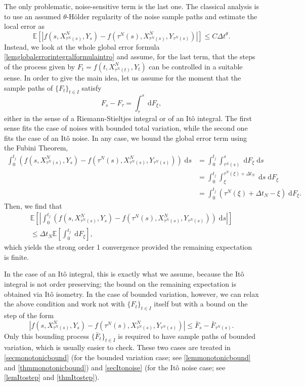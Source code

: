 \documentclass[reqno,12pt]{amsart}
\theoremstyle{plain}%
\theoremstyle{definition}
\begin{document}
The only problematic, noise-sensitive term is the last one. The classical analysis is to use an assumed $\theta$-H\"older regularity of the noise sample paths and estimate the local error as
\[
    \mathbb{E}\left[\left|f(s, X_{\tau^N(s)}^N, Y_s) - f(\tau^N(s), X_{\tau^N(s)}^N, Y_{\tau^N(s)})\right|\right] \leq C\Delta t^{\theta}.
\]
Instead, we look at the whole global error formula \eqref{lemglobalerrorintegralformulaintro} and assume, for the last term, that the steps of the process given by $F_t = f(t, X_{\tau^N(t)}^N, Y_t)$ can be controlled in a suitable sense. In order to give the main idea, let us assume for the moment that the sample paths of $\{F_t\}_{t\in I}$ satisfy
\[
    F_s - F_\tau = \int_\tau^s \;\mathrm{d}F_\xi,
\]
either in the sense of a Riemann-Stieltjes integral or of an It\^o integral. The first sense fits the case of noises with bounded total variation, while the second one fits the case of an It\^o noise. In any case, we bound the global error term using the Fubini Theorem,
\begin{align*}
    \int_0^{t_j} \left( f(s, X_{\tau^N(s)}^N, Y_s) - f(\tau^N(s), X_{\tau^N(s)}^N, Y_{\tau^N(s)}) \right)\;\mathrm{d}s & = \int_0^{t_j} \int_{\tau^N(s)}^s \;\mathrm{d}  F_\xi\;\mathrm{d}s \\
    & = \int_0^{t_j} \int_{\xi}^{\tau^N(\xi) + \Delta t_N} \;\mathrm{d}s \;\mathrm{d} F_\xi \\
    & = \int_0^{t_j} (\tau^N(\xi) + \Delta t_N - \xi) \;\mathrm{d} F_\xi.
\end{align*}
Then, we find that
\begin{multline*}
    \mathbb{E}\left[\left| \int_0^{t_j} \left( f(s, X_{\tau^N(s)}^N, Y_s) - f(\tau^N(s), X_{\tau^N(s)}^N, Y_{\tau^N(s)}) \right)\;\mathrm{d}s\right|\right] \\
    \leq \Delta t_N \mathbb{E}\left[\int_0^{t_j} \;\mathrm{d} F_\xi\right],
\end{multline*}
which yields the strong order 1 convergence provided the remaining expectation is finite.

In the case of an It\^o integral, this is exactly what we assume, because the It\^o integral is not order preserving; the bound on the remaining expectation is obtained via It\^o isometry. In the case of bounded variation, however, we can relax the above condition and work not with $\{F_t\}_{t\in I}$ itself but with a bound on the step of the form
\[
    |f(s, X_{\tau^N(s)}^N, Y_s) - f(\tau^N(s), X_{\tau^N(s)}^N, Y_{\tau^N(s)})| \leq \bar F_s - \bar F_{\tau^N(s)}.
\]
Only this bounding process $\{\bar F_t\}_{t\in I}$ is required to have sample paths of bounded variation, which is usually easier to check. These two cases are treated in \cref{secmonotonicbound} (for the bounded variation case; see \cref{lemmonotonicbound} and \cref{thmmonotonicbound}) and \cref{secItonoise} (for the It\^o noise case; see \cref{lemItostep} and \cref{thmItostep}).
\end{document}
